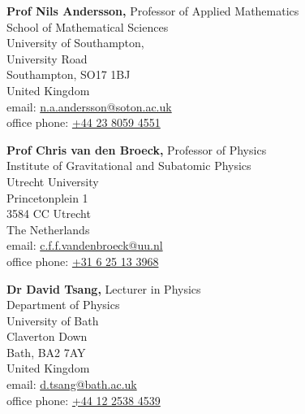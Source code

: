 \documentclass[%
    margin,
    line,
]{res}
\begin{document}
\begin{resume}
\vspace*{.05in}
\parbox{\textwidth}{%
\textbf{Prof Nils Andersson,} Professor of Applied Mathematics \\
School of Mathematical Sciences \\
University of Southampton, \\
University Road \\
Southampton, SO17 1BJ \\
United Kingdom \\
email: \href{mailto:n.a.andersson@soton.ac.uk}{n.a.andersson@soton.ac.uk} \\
office phone: \href{tel:+44 23 8059 4551}{+44 23 8059 4551}}
%
\par
\parbox{\textwidth}{%
\textbf{Prof Chris van den Broeck,} Professor of Physics \\
Institute of Gravitational and Subatomic Physics \\
Utrecht University \\
Princetonplein 1 \\
3584 CC Utrecht \\
The Netherlands \\
email: \href{mailto:c.f.f.vandenbroeck@uu.nl}{c.f.f.vandenbroeck@uu.nl} \\
office phone: \href{tel:+31 6 25 13 3968}{+31 6 25 13 3968}}
%
\par
\parbox{\textwidth}{%
\textbf{Dr David Tsang,} Lecturer in Physics \\
Department of Physics \\
University of Bath \\
Claverton Down \\
Bath, BA2 7AY \\
United Kingdom \\
email: \href{mailto:d.tsang@bath.ac.uk}{d.tsang@bath.ac.uk}\\
office phone: \href{tel:+44 12 2538 4539}{+44 12 2538 4539}}

\end{resume}
\end{document}
